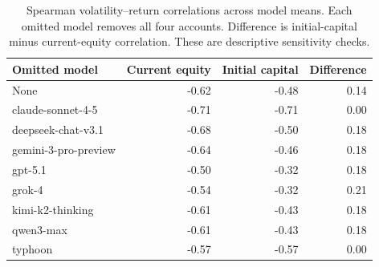 \begin{table}[htbp]
\centering\small
\caption{Spearman volatility--return correlations across model means. Each omitted model removes all four accounts. Difference is initial-capital minus current-equity correlation. These are descriptive sensitivity checks.}
\label{tab:feedbackloo}
\begin{tabular}{lrrr}
\toprule
Omitted model & Current equity & Initial capital & Difference \\
\midrule
None & -0.62 & -0.48 & 0.14 \\
claude-sonnet-4-5 & -0.71 & -0.71 & 0.00 \\
deepseek-chat-v3.1 & -0.68 & -0.50 & 0.18 \\
gemini-3-pro-preview & -0.64 & -0.46 & 0.18 \\
gpt-5.1 & -0.50 & -0.32 & 0.18 \\
grok-4 & -0.54 & -0.32 & 0.21 \\
kimi-k2-thinking & -0.61 & -0.43 & 0.18 \\
qwen3-max & -0.61 & -0.43 & 0.18 \\
typhoon & -0.57 & -0.57 & 0.00 \\
\bottomrule
\end{tabular}
\end{table}
